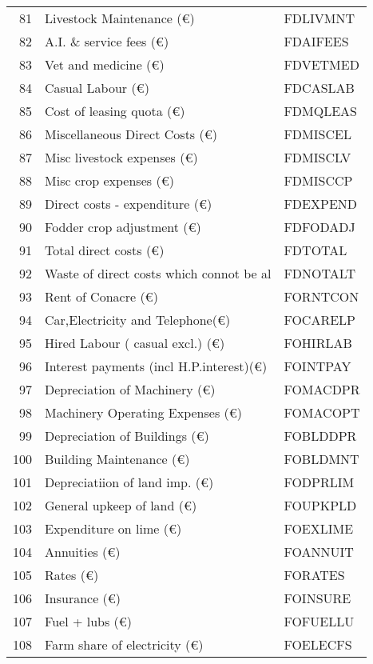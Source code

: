 \documentclass{article}\usepackage{graphicx, color}
\begin{document}
\begin{flushleft}
\begin{table}[ht]
\begin{center}
\begin{tabular}{rll}
  81 & Livestock Maintenance       (€) & FDLIVMNT \\ 
  82 & A.I. \& service fees         (€) & FDAIFEES \\ 
  83 & Vet and medicine            (€) & FDVETMED \\ 
  84 & Casual Labour               (€) & FDCASLAB \\ 
  85 & Cost of leasing quota       (€) & FDMQLEAS \\ 
  86 & Miscellaneous Direct Costs  (€) & FDMISCEL \\ 
  87 & Misc livestock expenses     (€) & FDMISCLV \\ 
  88 & Misc crop expenses          (€) & FDMISCCP \\ 
  89 & Direct costs - expenditure  (€) & FDEXPEND \\ 
  90 & Fodder crop adjustment      (€) & FDFODADJ \\ 
  91 & Total direct costs          (€) & FDTOTAL \\ 
  92 & Waste of direct costs which connot be al & FDNOTALT \\ 
  93 & Rent of Conacre              (€) & FORNTCON \\ 
  94 & Car,Electricity and Telephone(€) & FOCARELP \\ 
  95 & Hired Labour ( casual excl.) (€) & FOHIRLAB \\ 
  96 & Interest payments (incl H.P.interest)(€) & FOINTPAY \\ 
  97 & Depreciation of Machinery    (€) & FOMACDPR \\ 
  98 & Machinery Operating Expenses (€) & FOMACOPT \\ 
  99 & Depreciation of Buildings    (€) & FOBLDDPR \\ 
  100 & Building Maintenance         (€) & FOBLDMNT \\ 
  101 & Depreciatiion of land imp.   (€) & FODPRLIM \\ 
  102 & General upkeep of land       (€) & FOUPKPLD \\ 
  103 & Expenditure on lime          (€) & FOEXLIME \\ 
  104 & Annuities                    (€) & FOANNUIT \\ 
  105 & Rates                        (€) & FORATES \\ 
  106 & Insurance                    (€) & FOINSURE \\ 
  107 & Fuel + lubs                  (€) & FOFUELLU \\ 
  108 & Farm share of electricity    (€) & FOELECFS \\ 

\end{tabular}
\end{center}
\end{table}
\end{flushleft}
\end{document}
